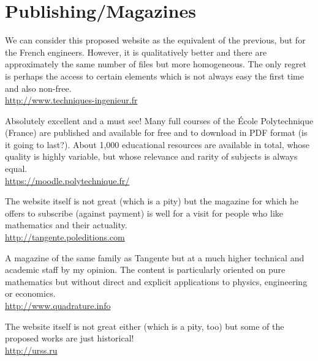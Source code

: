	\pagebreak
	\section{Publishing/Magazines}

	{\Large {}}{\Large {}}{\Large {}}{\Large {}}{\Large {}}\bcdfrance{} We can consider this proposed website as the equivalent of the previous, but for the French engineers. However, it is qualitatively better and there are approximately the same number of files but more homogeneous. The only regret is perhaps the access to certain elements which is not always easy the first time and also non-free.\\
	\href{http://www.techniques-ingenieur.fr}{\color{blue} http://www.techniques-ingenieur.fr}
	
	{\Large {}}{\Large {}}{\Large {}}{\Large {}}\bcdfrance{} Absolutely excellent and a must see! Many full courses of the École Polytechnique (France) are published and available for free and to download in PDF format (is it going to last?). About 1,000 educational resources are available in total, whose quality is highly variable, but whose relevance and rarity of subjects is always equal.\\
	\href{https://moodle.polytechnique.fr}{\color{blue} https://moodle.polytechnique.fr/}
	
	{\Large {}}{\Large {}}{\Large {}}{\Large {}}\bcdfrance{}  The website itself is not great (which is a pity) but the magazine for which he offers to subscribe (against payment) is well for a visit for people who like mathematics and their actuality.\\
	\href{http://tangente.poleditions.com}{\color{blue}http://tangente.poleditions.com}
	
	{\Large {}}{\Large {}}{\Large {}}{\Large {}}\bcdfrance{} A magazine of the same family as Tangente but at a much higher technical and academic staff by my opinion. The content is particularly oriented on pure mathematics but without direct and explicit applications to physics, engineering or economics.\\
	\href{http://www.quadrature.info}{\color{blue}http://www.quadrature.info}
	
	{\Large {}}{\Large {}}{\Large {}}{\Large {}} The website itself is not great either (which is a pity, too) but some of the proposed works are just historical!\\
	\href{http://urss.ru}{\color{blue}http://urss.ru}
	
